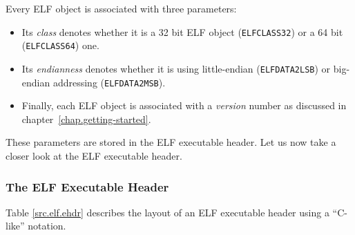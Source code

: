 \documentclass[a4paper,pdftex]{book}
\newcommand{\constant}[1]{\texttt{#1}}
\newcommand{\firstterm}[1]{\textit{#1}}
\begin{document}
Every ELF object is associated with three parameters:

\begin{itemize}
\item Its \firstterm{class} denotes
  whether it is a 32 bit ELF object (\constant{ELFCLASS32}) or a 64
  bit (\constant{ELFCLASS64}) one.
\item Its \firstterm{endianness} denotes whether
  it is using little-endian (\constant{ELFDATA2LSB}) or big-endian
  addressing (\constant{ELFDATA2MSB}).
\item Finally, each ELF object is associated with a
  \firstterm{version} number as discussed in
  chapter~\vref{chap.getting-started}.
\end{itemize}

These parameters are stored in the ELF executable header.  Let us now
take a closer look at the ELF executable header.

\subsubsection{The ELF Executable Header}\label{sec.ehdr}
Table \vref{src.elf.ehdr} describes the layout of an ELF executable
header using a ``C-like'' notation.%
\end{document}
